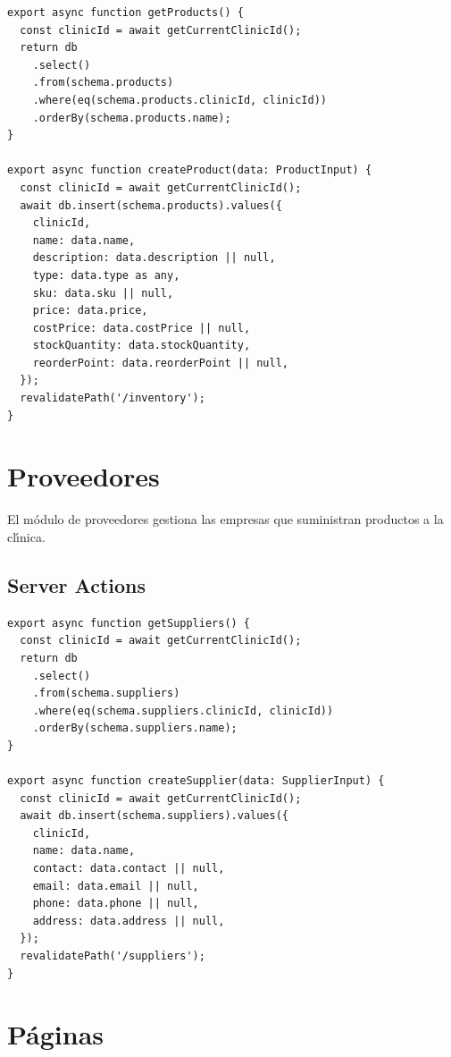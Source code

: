 \begin{lstlisting}[style=typescript, caption=Productos - Patron CRUD estandar]
export async function getProducts() {
  const clinicId = await getCurrentClinicId();
  return db
    .select()
    .from(schema.products)
    .where(eq(schema.products.clinicId, clinicId))
    .orderBy(schema.products.name);
}

export async function createProduct(data: ProductInput) {
  const clinicId = await getCurrentClinicId();
  await db.insert(schema.products).values({
    clinicId,
    name: data.name,
    description: data.description || null,
    type: data.type as any,
    sku: data.sku || null,
    price: data.price,
    costPrice: data.costPrice || null,
    stockQuantity: data.stockQuantity,
    reorderPoint: data.reorderPoint || null,
  });
  revalidatePath('/inventory');
}
\end{lstlisting}

\section{Proveedores}

El m\'odulo de proveedores gestiona las empresas que suministran productos
a la cl\'{\i}nica.

\subsection{Server Actions}

\begin{lstlisting}[style=typescript, caption=Proveedores - Patron CRUD estandar]
export async function getSuppliers() {
  const clinicId = await getCurrentClinicId();
  return db
    .select()
    .from(schema.suppliers)
    .where(eq(schema.suppliers.clinicId, clinicId))
    .orderBy(schema.suppliers.name);
}

export async function createSupplier(data: SupplierInput) {
  const clinicId = await getCurrentClinicId();
  await db.insert(schema.suppliers).values({
    clinicId,
    name: data.name,
    contact: data.contact || null,
    email: data.email || null,
    phone: data.phone || null,
    address: data.address || null,
  });
  revalidatePath('/suppliers');
}
\end{lstlisting}

\section{P\'aginas}

